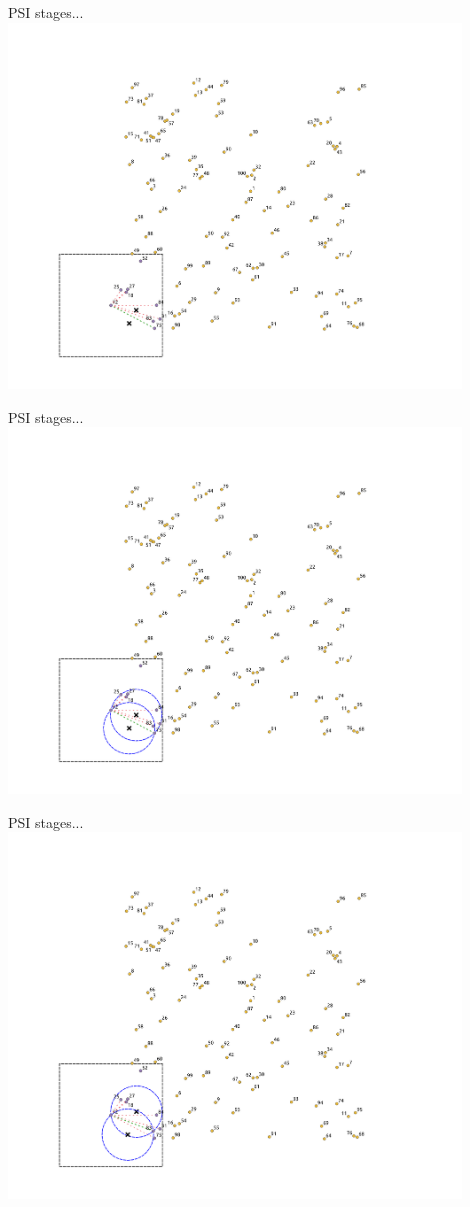 \documentclass{beamer}
\begin{document}
\begin{frame}{PSI stages...}
    \centering
    \includegraphics[trim={0cm 0cm 0cm 1.5cm}, clip, width=0.9\textwidth]{figures/psi2/p06}
\end{frame}
\begin{frame}{PSI stages...}
    \centering
    \includegraphics[trim={0cm 0cm 0cm 1.5cm}, clip, width=0.9\textwidth]{figures/psi2/p07}
\end{frame}
\begin{frame}{PSI stages...}
    \centering
    \includegraphics[trim={0cm 0cm 0cm 1.5cm}, clip, width=0.9\textwidth]{figures/psi2/p08}
\end{frame}
\end{document}
